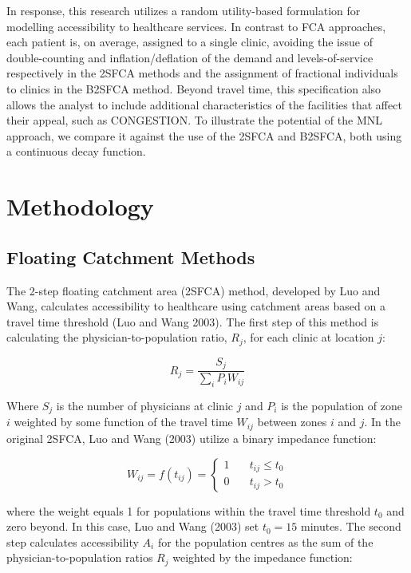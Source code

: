 \documentclass{article}
\begin{document}
In response, this research utilizes a random utility-based formulation
for modelling accessibility to healthcare services. In contrast to FCA
approaches, each patient is, on average, assigned to a single clinic,
avoiding the issue of double-counting and inflation/deflation of the
demand and levels-of-service respectively in the 2SFCA methods and the
assignment of fractional individuals to clinics in the B2SFCA method.
Beyond travel time, this specification also allows the analyst to
include additional characteristics of the facilities that affect their
appeal, such as CONGESTION. To illustrate the potential of the MNL
approach, we compare it against the use of the 2SFCA and B2SFCA, both
using a continuous decay function.

\hypertarget{methodology}{%
\section{Methodology}\label{methodology}}

\hypertarget{floating-catchment-methods}{%
\subsection{Floating Catchment
Methods}\label{floating-catchment-methods}}

The 2-step floating catchment area (2SFCA) method, developed by Luo and
Wang, calculates accessibility to healthcare using catchment areas based
on a travel time threshold (Luo and Wang 2003). The first step of this
method is calculating the physician-to-population ratio, \(R_j\), for
each clinic at location \(j\):

\[
R_j = \frac{S_j}{\sum_i{P_iW_{ij}}}
\]

Where \(S_j\) is the number of physicians at clinic \(j\) and \(P_i\) is
the population of zone \(i\) weighted by some function of the travel
time \(W_{ij}\) between zones \(i\) and \(j\). In the original 2SFCA,
Luo and Wang (2003) utilize a binary impedance function:

\[
W_{ij} = f(t_{ij}) = \left\{
        \begin{array}{ll}
            1 & \quad t_{ij} \leq t_0 \\
            0 & \quad t_{ij} > t_0
        \end{array}
    \right.
\]

where the weight equals 1 for populations within the travel time
threshold \(t_0\) and zero beyond. In this case, Luo and Wang (2003) set
\(t_0 = 15\) minutes. The second step calculates accessibility \(A_i\)
for the population centres as the sum of the physician-to-population
ratios \(R_j\) weighted by the impedance function:
\end{document}
